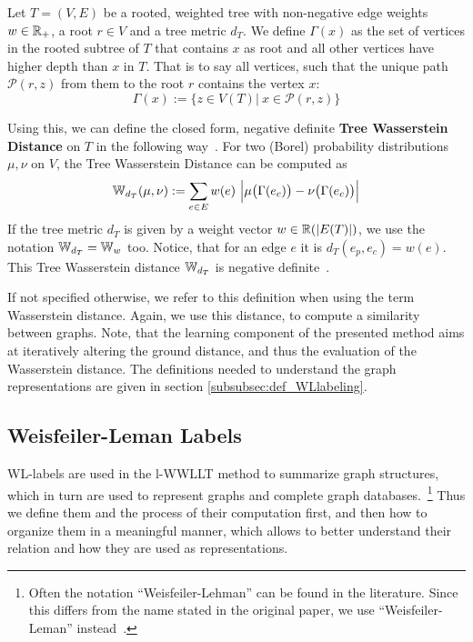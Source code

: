 		Let $T=(V, E)$ be a rooted, weighted tree with non-negative edge weights $w\in\mathbb{R}_+$, a root $r\in V$ and a tree metric $d_T$.
		We define $\Gamma(x)$ as the set of vertices in the rooted subtree of $T$ that contains $x$ as root and all other vertices have higher depth than $x$ in $T$. 
		That is to say all vertices, such that the unique path $\mathcal{P}(r, z)$ from them to the root $r$ contains the vertex $x$:
		\[ \Gamma(x) := \{ z\in V(T)|\ x\in \mathcal{P}(r, z) \} \]
		
		Using this, we can define the closed form, negative definite \textbf{Tree Wasserstein Distance} on $T$ in the following way~\cite{2019_Le_NIPS}. %
		For two (Borel) probability distributions $\mu, \nu$ on $V$, the Tree Wasserstein Distance can be computed as
		\begin{equation}\label{eq:TreeWassDist}
			\mathbb{W}_{d_T}(\mu, \nu) := \sum_{e\in E} w(e) \ \Big|\mu \big( \Gamma(e_c) \big) - \nu \big( \Gamma(e_c) \big) \Big|
		\end{equation}
		If the tree metric $d_T$ is given by a weight vector $w\in\mathbb{R}(|E(T)|)$, we use the notation $\mathbb{W}_{d_T} = \mathbb{W}_{w}$ too.
		Notice, that for an edge $e$ it is $d_T(e_p, e_c) = w(e)$.
		This Tree Wasserstein distance $\mathbb{W}_{d_T}$ is negative definite~\cite{2019_Le_NIPS}.	
		
		If not specified otherwise, we refer to this definition when using the term Wasserstein distance.
		Again, we use this distance, to compute a similarity between graphs.
		Note, that the learning component of the presented method aims at iteratively altering the ground distance, and thus the evaluation of the Wasserstein distance.
		The definitions needed to understand the graph representations are given in section \ref{subsubsec:def_WLlabeling}.
		
\subsection{Weisfeiler-Leman Labels} \label{subsec:def_WL}
	
	WL-labels are used in the l-WWLLT method to summarize graph structures, which in turn are used to represent graphs and complete graph data\-bases.~\footnote{Often the notation \enquote{Weisfeiler-Lehman} can be found in the literature. Since this differs from the name stated in the original paper, we use \enquote{Weisfeiler-Leman} instead~\cite{1968_Weisfeiler_CONF}.}\;
	Thus we define them and the process of their computation first, and then how to organize them in a meaningful manner, which allows to better understand their relation and how they are used as representations.
	
